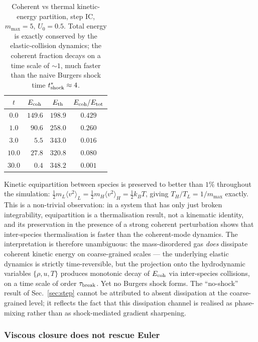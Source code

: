 \documentclass[aps,pre,twocolumn,superscriptaddress,longbibliography,floatfix]{revtex4-2}
\begin{document}
\begin{table}[t]
\centering
\caption{Coherent vs thermal kinetic-energy partition, step IC,
$m_{\max}=5$, $U_0=0.5$. Total energy is exactly conserved by
the elastic-collision dynamics; the coherent fraction decays
on a time scale of $\sim 1$, much faster than the naive
Burgers shock time $t^*_{\rm shock}\approx 4$.}
\label{tab:ent}
\begin{tabular}{cccc}
\hline\hline
$t$ & $E_{\rm coh}$ & $E_{\rm th}$ & $E_{\rm coh}/E_{\rm tot}$\\
\hline
$0.0$  & $149.6$ & $198.9$ & $0.429$\\
$1.0$  & $\phantom{0}90.6$ & $258.0$ & $0.260$\\
$3.0$  & $\phantom{00}5.5$ & $343.0$ & $0.016$\\
$10.0$ & $\phantom{0}27.8$ & $320.8$ & $0.080$\\
$30.0$ & $\phantom{00}0.4$ & $348.2$ & $0.001$\\
\hline\hline
\end{tabular}
\end{table}

Kinetic equipartition between species is preserved to better
than $1\%$ throughout the simulation: $\tfrac12 m_L\langle
v^2\rangle_L = \tfrac12 m_H\langle v^2\rangle_H = \tfrac12 k_B T$,
giving $T_H/T_L = 1/m_{\max}$ exactly. This is a non-trivial
observation: in a system that has only just broken
integrability, equipartition is a thermalisation result, not
a kinematic identity, and its preservation in the presence of
a strong coherent perturbation shows that inter-species
thermalisation is faster than the coherent-mode dynamics.
The interpretation is therefore unambiguous: the mass-disordered
gas \emph{does} dissipate coherent kinetic energy on
coarse-grained scales --- the underlying elastic dynamics is
strictly time-reversible, but the projection onto the
hydrodynamic variables $\{\rho, u, T\}$ produces monotonic decay
of $E_{\rm coh}$ via inter-species collisions, on a time scale
of order $\tau_{\rm break}$. Yet no Burgers shock forms. The
``no-shock'' result of Sec.~\ref{sec:step} cannot be attributed
to absent dissipation at the coarse-grained level; it reflects
the fact that this dissipation channel is realised as
phase-mixing rather than as shock-mediated gradient sharpening.

\subsubsection*{Viscous closure does not rescue Euler}
\end{document}
